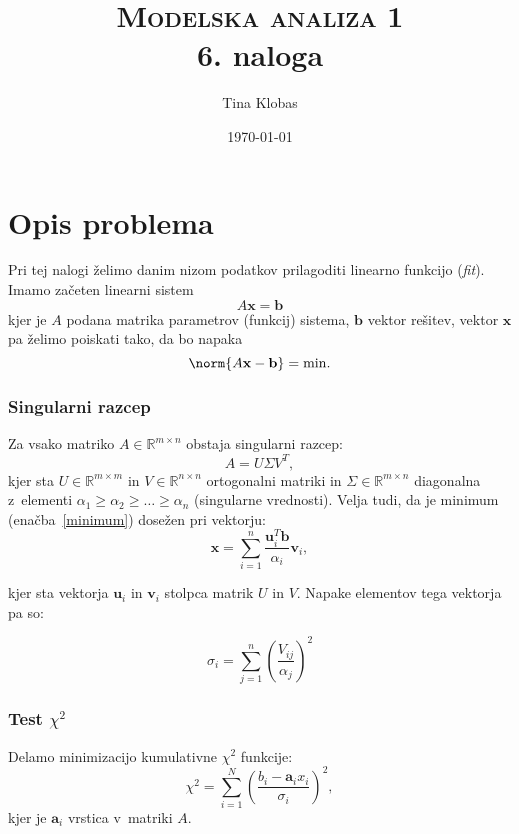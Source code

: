 \documentclass[a4paper,pdftex,12pt]{article}
\title{	
\normalfont \normalsize 
\textsc{Modelska analiza 1} \\ [25pt] %
\huge 6. naloga\\ %
}
\author{Tina Klobas} %
\date{\normalsize\today} %
\renewcommand{\vec}[1]{\boldsymbol{\mathbf{#1}}}
\numberwithin{figure}{section} %
\begin{document}
\maketitle %

\section{Opis problema}
Pri tej nalogi želimo danim nizom podatkov prilagoditi linearno funkcijo (\emph{fit}).
Imamo začeten linearni sistem
\begin{equation}
    A \vec{x} = \vec{b}
\end{equation}
kjer je $A$ podana matrika parametrov (funkcij) sistema, $\vec{b}$ vektor rešitev,
vektor $\vec{x}$ pa želimo poiskati tako, da bo napaka
\begin{equation}\label{minimum}
    \norm{A\vec{x}-\vec{b}}=\mathrm{min}.
\end{equation}

\subsubsection*{Singularni razcep}
Za vsako matriko $A \in \mathbb{R}^{m \times n}$ obstaja singularni razcep:
\begin{equation}
    A = U \Sigma V^{T},
\end{equation}
kjer sta $U \in \mathbb{R}^{m\times m}$ in $V \in \mathbb{R}^{n\times n}$ ortogonalni
matriki in $\Sigma \in \mathbb{R}^{m \times n}$ diagonalna z~elementi $\alpha_1 \geq 
\alpha_2 \geq \dots \geq \alpha_n$ (singularne vrednosti). Velja tudi, da je minimum
(enačba~\ref{minimum}) dosežen pri vektorju:
\begin{equation}\label{singular}
    \vec{x} = \sum_{i=1}^n \frac{\vec{u}_i^T \vec{b}}{\alpha_i}\vec{v}_i,
\end{equation}

kjer sta vektorja $\vec{u}_i$ in $\vec{v}_i$ stolpca matrik $U$ in $V$.
Napake elementov tega vektorja pa so:

\begin{equation}\label{singularsigma}
    \sigma_i = \sum_{j=1}^n \left( \frac{V_{ij}}{\alpha_j} \right)^2
\end{equation}


\subsubsection*{Test $\chi^2$}
Delamo minimizacijo kumulativne $\chi^2$ funkcije:
\begin{equation}\label{hi2}
    \chi^2 = \sum_{i=1}^{N} \left( \frac{b_i - \vec{a}_i x_i}{\sigma_i} \right)^2,
\end{equation}
kjer je $\vec{a}_i$ vrstica v~matriki $A$.
\end{document}
